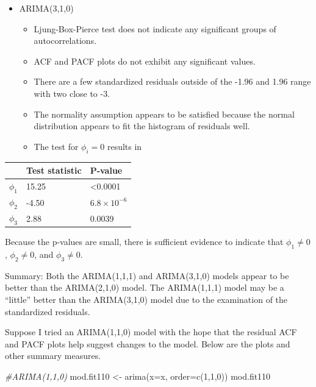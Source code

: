 \documentclass[
]{book}
\newenvironment{Shaded}{\begin{snugshade}}{\end{snugshade}}
\newcommand{\AttributeTok}[1]{\textcolor[rgb]{0.77,0.63,0.00}{#1}}
\newcommand{\CommentTok}[1]{\textcolor[rgb]{0.56,0.35,0.01}{\textit{#1}}}
\newcommand{\DecValTok}[1]{\textcolor[rgb]{0.00,0.00,0.81}{#1}}
\newcommand{\FunctionTok}[1]{\textcolor[rgb]{0.00,0.00,0.00}{#1}}
\newcommand{\NormalTok}[1]{#1}
\newcommand{\OtherTok}[1]{\textcolor[rgb]{0.56,0.35,0.01}{#1}}
\providecommand{\tightlist}{%
  \setlength{\itemsep}{0pt}\setlength{\parskip}{0pt}}
\theoremstyle{definition}
\theoremstyle{definition}
\theoremstyle{definition}
\theoremstyle{definition}
\theoremstyle{remark}
\begin{document}
\begin{itemize}
\tightlist
\item
  ARIMA(3,1,0)

  \begin{itemize}
  \tightlist
  \item
    Ljung-Box-Pierce test does not indicate any significant groups of autocorrelations.\\
  \item
    ACF and PACF plots do not exhibit any significant values.\\
  \item
    There are a few standardized residuals outside of the -1.96 and 1.96 range with two close to -3.
  \item
    The normality assumption appears to be satisfied because the normal distribution appears to fit the histogram of residuals well.\\
  \item
    The test for \(\phi_i = 0\) results in
  \end{itemize}
\end{itemize}

\begin{longtable}[]{@{}lll@{}}
\toprule()
& Test statistic & P-value \\
\midrule()
\endhead
\(\phi_1\) & 15.25 & \textless0.0001 \\
\(\phi_2\) & -4.50 & \(6.8\times 10^{-6}\) \\
\(\phi_3\) & 2.88 & 0.0039 \\
\bottomrule()
\end{longtable}

Because the p-values are small, there is sufficient evidence to indicate that \(\phi_1 \ne 0\), \(\phi_2\ne 0\), and \(\phi_3\ne 0\).

Summary: Both the ARIMA(1,1,1) and ARIMA(3,1,0) models appear to be better than the ARIMA(2,1,0) model. The ARIMA(1,1,1) model may be a ``little'' better than the ARIMA(3,1,0) model due to the examination of the standardized residuals.

Suppose I tried an ARIMA(1,1,0) model with the hope that the residual ACF and PACF plots help suggest changes to the model. Below are the plots and other summary measures.

\begin{Shaded}
\begin{Highlighting}[]
\CommentTok{\#ARIMA(1,1,0)}
\NormalTok{mod.fit110 }\OtherTok{\textless{}{-}} \FunctionTok{arima}\NormalTok{(}\AttributeTok{x=}\NormalTok{x, }\AttributeTok{order=}\FunctionTok{c}\NormalTok{(}\DecValTok{1}\NormalTok{,}\DecValTok{1}\NormalTok{,}\DecValTok{0}\NormalTok{))}
\NormalTok{mod.fit110}
\end{Highlighting}
\end{Shaded}
\end{document}
